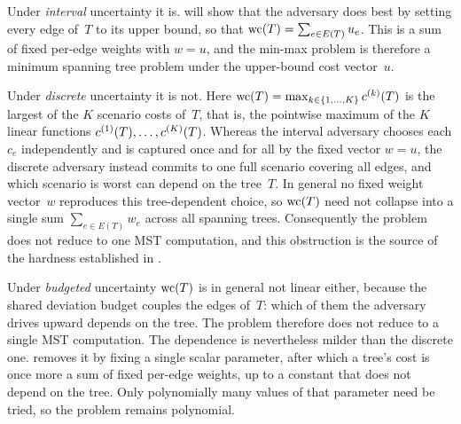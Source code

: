 Under \emph{interval} uncertainty it is.
 will show that the adversary does best by setting every edge of~$T$ to its upper bound, so that $\mathrm{wc}(T) = \sum_{e \in E(T)} u_e$.
This is a sum of fixed per-edge weights with $w = u$, and the min-max problem is therefore a minimum spanning tree problem under the upper-bound cost vector~$u$.

Under \emph{discrete} uncertainty it is not.
Here $\mathrm{wc}(T) = \max_{k \in \{1, \ldots, K\}} c^{(k)}(T)$ is the largest of the $K$ scenario costs of~$T$, that is, the pointwise maximum of the $K$ linear functions $c^{(1)}(T), \ldots, c^{(K)}(T)$.
Whereas the interval adversary chooses each $c_e$ independently and is captured once and for all by the fixed vector $w = u$, the discrete adversary instead commits to one full scenario covering all edges, and which scenario is worst can depend on the tree~$T$.
In general no fixed weight vector~$w$ reproduces this tree-dependent choice, so $\mathrm{wc}(T)$ need not collapse into a single sum $\sum_{e \in E(T)} w_e$ across all spanning trees.
Consequently the problem does not reduce to one MST computation, and this obstruction is the source of the hardness established in .

Under \emph{budgeted} uncertainty $\mathrm{wc}(T)$ is in general not linear either, because the shared deviation budget couples the edges of~$T$: which of them the adversary drives upward depends on the tree.
The problem therefore does not reduce to a single MST computation.
The dependence is nevertheless milder than the discrete one.
 removes it by fixing a single scalar parameter, after which a tree's cost is once more a sum of fixed per-edge weights, up to a constant that does not depend on the tree.
Only polynomially many values of that parameter need be tried, so the problem remains polynomial.

%
